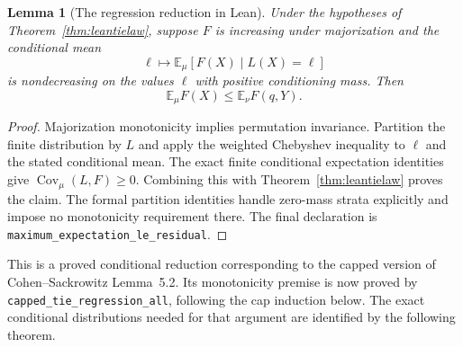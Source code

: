 \documentclass[11pt]{article}
\newtheorem{lemma}{Lemma}
\begin{document}
\begin{lemma}[The regression reduction in Lean]\label{lem:leantieregression}
Under the hypotheses of Theorem~\ref{thm:leantielaw}, suppose $F$ is
increasing under majorization and the conditional mean
\[
 \ell\longmapsto\mathbb E_\mu[F(X)\mid L(X)=\ell]
\]
is nondecreasing on the values $\ell$ with positive conditioning mass.
Then
\[
 \mathbb E_\mu F(X)\leq\mathbb E_\nu F(q,Y).
\]
\end{lemma}
\begin{proof}
Majorization monotonicity implies permutation invariance. Partition the
finite distribution by $L$ and apply the weighted Chebyshev inequality
to $\ell$ and the stated conditional mean. The exact finite conditional
expectation identities give $\operatorname{Cov}_\mu(L,F)\geq0$.
Combining this with Theorem~\ref{thm:leantielaw} proves the claim.
The formal partition identities handle zero-mass strata explicitly and
impose no monotonicity requirement there. The final declaration is
\texttt{maximum\_expectation\_le\_residual}.
\end{proof}

This is a proved conditional reduction corresponding to the capped
version of Cohen--Sackrowitz Lemma~5.2. Its monotonicity premise is now
proved by \texttt{capped\_tie\_regression\_all}, following the cap induction
below. The exact conditional distributions needed for that argument are
identified by the following theorem.
\end{document}
